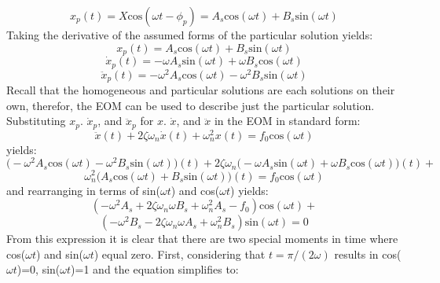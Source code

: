 \documentclass[12pt,letter]{article}
\numberwithin{ex}{section} %
\numberwithin{re}{section} %
\begin{document}
			\begin{equation}
				x_p(t) = X \text{cos}(\omega t - \phi_p) = A_s \text{cos}(\omega t) + B_s  \text{sin}(\omega t)
			\end{equation}			 
			Taking the derivative of the assumed forms of the particular solution yields:
			\begin{equation}
				x_p(t) = A_s \text{cos}(\omega t) + B_s  \text{sin}(\omega t)
			\end{equation}	
			\begin{equation}
				\dot{x}_p(t) = -\omega A_s \text{sin}(\omega t) + \omega B_s  \text{cos}(\omega t)
			\end{equation}				 
			\begin{equation}
				\ddot{x}_p(t) = -\omega^2 A_s \text{cos}(\omega t) - \omega^2 B_s  \text{sin}(\omega t)
			\end{equation}				
			Recall that the homogeneous and particular solutions are each solutions on their own, therefor, the EOM can be used to describe just the particular solution. Substituting $x_p$. $\dot{x}_p$, and $\ddot{x}_p$ for $x$. $\dot{x}$, and $\ddot{x}$ in the EOM in standard form:
			\begin{equation}
			 	\ddot{x}(t)+2 \zeta \omega_n \dot{x}(t) +\omega_n^2x(t) = f_0\text{cos}(\omega t)
			\end{equation}
			yields:
			\begin{equation}
			 	\big(	-\omega^2 A_s \text{cos}(\omega t) - \omega^2 B_s  \text{sin}(\omega t) \big)(t)+2 \zeta \omega_n  \big( -\omega A_s \text{sin}(\omega t) + \omega B_s  \text{cos}(\omega t)  \big) (t) +
			\end{equation}
			\begin{equation*}
				\omega_n^2 \big( A_s \text{cos}(\omega t) + B_s  \text{sin}(\omega t) \big)(t) = f_0\text{cos}(\omega t)
			\end{equation*}				
			and rearranging in terms of sin($\omega t$) and cos($\omega t$) yields: 
			\begin{equation}
				(-\omega^2 A_s + 2 \zeta \omega_n \omega B_s + \omega_n^2 A_s -f_0) \text{cos}(\omega t) + 
			\end{equation}
			\begin{equation*}
				(-\omega^2 B_s - 2 \zeta \omega_n \omega A_s + \omega_n^2 B_s)\text{sin}(\omega t) =0
			\end{equation*}	
			From this expression it is clear that there are two special moments in time where cos($\omega t$) and sin($\omega t$) equal zero. First, considering that $t=\pi/(2\omega)$ results in cos($\omega t$)=0, sin($\omega t$)=1 and the equation simplifies to:
\end{document}
